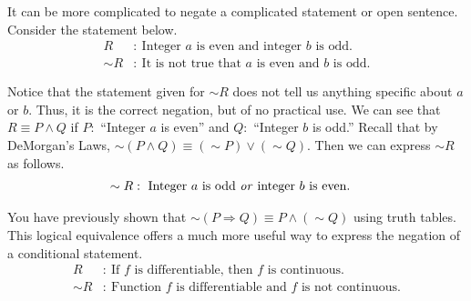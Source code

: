 \documentclass[12 pt]{article}
\theoremstyle{definition}
\theoremstyle{plain}
\theoremstyle{mytheorem}
\theoremstyle{myexample}
\theoremstyle{mydefinition}
\begin{document}
\noindent It can be more complicated to negate a complicated statement or open sentence.  Consider the statement below.
	\begin{align*}
	R &: \ \mbox{Integer $a$ is even and integer $b$ is odd.}\\
	\sim R&: \ \mbox{It is not true that $a$ is even and $b$ is odd.}
	\end{align*}

Notice that the statement given for $\sim R$ does not tell us anything specific about $a$ or $b$.  Thus, it is the correct negation, but of no practical use.  We can see that $R \equiv P \wedge Q$ if $P:$ ``Integer $a$ is even'' and $Q:$ ``Integer $b$ is odd.''  Recall that by DeMorgan's Laws, $\sim (P \wedge Q) \equiv (\sim P) \vee (\sim Q)$.  Then we can express $\sim R$ as follows.
	\begin{align*}
	\sim R &: \ \mbox{Integer $a$ is odd \textit{or} integer $b$ is even.}
	\end{align*}
	
\noindent You have previously shown that $ \sim(P \Rightarrow Q) \equiv P \wedge (\sim Q)$ using truth tables.  This logical equivalence offers a much more useful way to express the negation of a conditional statement.
	\begin{align*}
	R &: \ \mbox{If $f$ is differentiable, then $f$ is continuous.}\\
	\sim R &: \ \mbox{Function $f$ is differentiable and $f$ is not continuous.}
	\end{align*}
	
\end{document}
